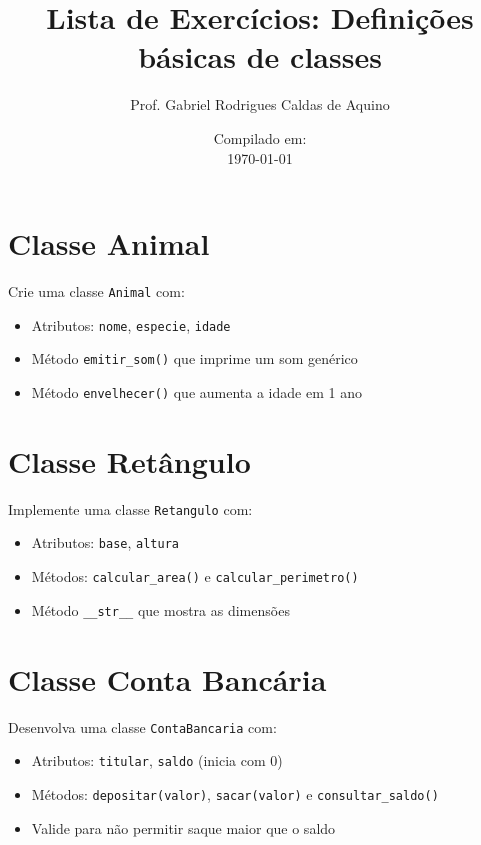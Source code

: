 \title{Lista de Exercícios: Definições básicas de classes}
\author{Prof. Gabriel Rodrigues Caldas de Aquino}

\date{Compilado em: \\ \today}



\maketitle

\section{Classe Animal}
Crie uma classe \texttt{Animal} com:
\begin{itemize}
    \item Atributos: \texttt{nome}, \texttt{especie}, \texttt{idade}
    \item Método \texttt{emitir\_som()} que imprime um som genérico
    \item Método \texttt{envelhecer()} que aumenta a idade em 1 ano
\end{itemize}

\section{Classe Retângulo}
Implemente uma classe \texttt{Retangulo} com:
\begin{itemize}
    \item Atributos: \texttt{base}, \texttt{altura}
    \item Métodos: \texttt{calcular\_area()} e \texttt{calcular\_perimetro()}
    \item Método \texttt{\_\_str\_\_} que mostra as dimensões
\end{itemize}

\section{Classe Conta Bancária}
Desenvolva uma classe \texttt{ContaBancaria} com:
\begin{itemize}
    \item Atributos: \texttt{titular}, \texttt{saldo} (inicia com 0)
    \item Métodos: \texttt{depositar(valor)}, \texttt{sacar(valor)} e \texttt{consultar\_saldo()}
    \item Valide para não permitir saque maior que o saldo
\end{itemize}

